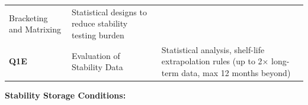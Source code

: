 \documentclass[
  11pt,
  a4paper,
]{report}
\begin{document}
\begin{longtable}[]{@{}lll@{}}
\begin{minipage}[t]{0.21\columnwidth}
Bracketing and Matrixing\strut
\end{minipage} & \begin{minipage}[t]{0.38\columnwidth}\raggedright
Statistical designs to reduce stability testing burden\strut
\end{minipage}\tabularnewline
\begin{minipage}[t]{0.32\columnwidth}\raggedright
\textbf{Q1E}\strut
\end{minipage} & \begin{minipage}[t]{0.21\columnwidth}\raggedright
Evaluation of Stability Data\strut
\end{minipage} & \begin{minipage}[t]{0.38\columnwidth}\raggedright
Statistical analysis, shelf-life extrapolation rules (up to 2× long-term
data, max 12 months beyond)\strut
\end{minipage}\tabularnewline
\bottomrule
\end{longtable}

\textbf{Stability Storage Conditions:}
\end{document}
